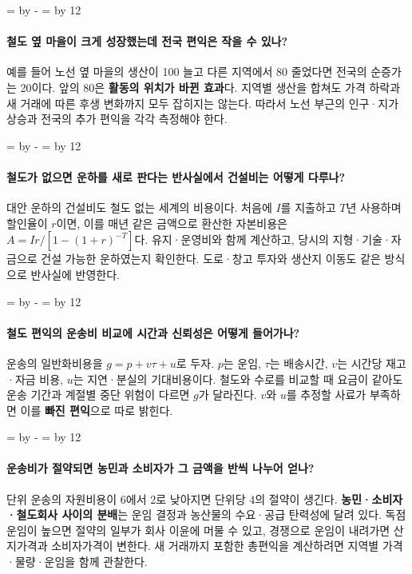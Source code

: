 \documentclass[10pt,a4paper]{article}
\newcommand{\ReserveQuestionSpace}{%
  \par\begingroup
  \dimen0=\pagegoal \advance\dimen0 by -\pagetotal
  \dimen2=\baselineskip \multiply\dimen2 by 12
  \ifdim\dimen0<\dimen2 \newpage\fi
  \endgroup}
\begin{document}
\ReserveQuestionSpace
\paragraph{철도 옆 마을이 크게 성장했는데 전국 편익은 작을 수 있나?}
예를 들어 노선 옆 마을의 생산이 100 늘고 다른 지역에서 80 줄었다면 전국의 순증가는 20이다. 앞의 80은 \textbf{활동의 위치가 바뀐 효과}다. 지역별 생산을 합쳐도 가격 하락과 새 거래에 따른 후생 변화까지 모두 잡히지는 않는다. 따라서 노선 부근의 인구·지가 상승과 전국의 추가 편익을 각각 측정해야 한다.\par

\ReserveQuestionSpace
\paragraph{철도가 없으면 운하를 새로 판다는 반사실에서 건설비는 어떻게 다루나?}
대안 운하의 건설비도 철도 없는 세계의 비용이다. 처음에 $I$를 지출하고 $T$년 사용하며 할인율이 $r$이면, 이를 매년 같은 금액으로 환산한 자본비용은 $A=Ir/[1-(1+r)^{-T}]$다. 유지·운영비와 함께 계산하고, 당시의 지형·기술·자금으로 건설 가능한 운하였는지 확인한다. 도로·창고 투자와 생산지 이동도 같은 방식으로 반사실에 반영한다.\par

\ReserveQuestionSpace
\paragraph{철도 편익의 운송비 비교에 시간과 신뢰성은 어떻게 들어가나?}
운송의 일반화비용을 $g=p+v\tau+u$로 두자. $p$는 운임, $\tau$는 배송시간, $v$는 시간당 재고·자금 비용, $u$는 지연·분실의 기대비용이다. 철도와 수로를 비교할 때 요금이 같아도 운송 기간과 계절별 중단 위험이 다르면 $g$가 달라진다. $v$와 $u$를 추정할 사료가 부족하면 이를 \textbf{빠진 편익}으로 따로 밝힌다.\par

\ReserveQuestionSpace
\paragraph{운송비가 절약되면 농민과 소비자가 그 금액을 반씩 나누어 얻나?}
단위 운송의 자원비용이 6에서 2로 낮아지면 단위당 4의 절약이 생긴다. \textbf{농민·소비자·철도회사 사이의 분배}는 운임 결정과 농산물의 수요·공급 탄력성에 달려 있다. 독점 운임이 높으면 절약의 일부가 회사 이윤에 머물 수 있고, 경쟁으로 운임이 내려가면 산지가격과 소비자가격이 변한다. 새 거래까지 포함한 총편익을 계산하려면 지역별 가격·물량·운임을 함께 관찰한다.\par
\end{document}
